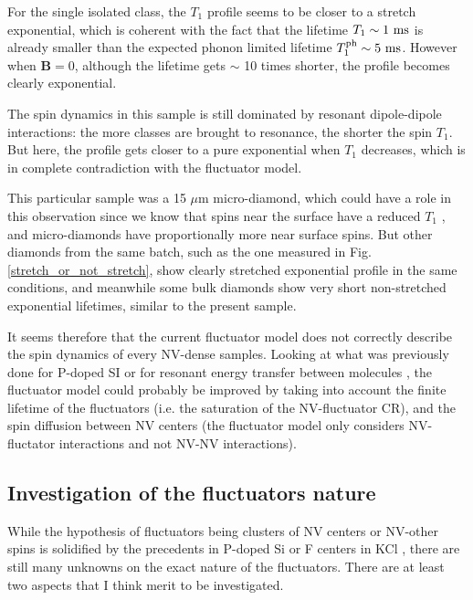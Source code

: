 \documentclass[a4paper,11pt]{report}
\begin{document}
For the single isolated class, the $T_1$ profile seems to be closer to a stretch exponential, which is coherent with the fact that the lifetime $T_1 \sim 1\ \rm ms$ is already smaller than the expected phonon limited lifetime $T_1^{\rm ph} \sim 5\ \rm ms$. However when $\mathbf{B}=0$, although the lifetime gets $\sim$ 10 times shorter, the profile becomes clearly exponential. 

The spin dynamics in this sample is still dominated by resonant dipole-dipole interactions: the more classes are brought to resonance, the shorter the spin $T_1$. But here, the profile gets closer to a pure exponential when $T_1$ decreases, which is in complete contradiction with the fluctuator model.

This particular sample was a 15 $\mu$m micro-diamond, which could have a role in this observation since we know that spins near the surface have a reduced $T_1$ \citep{rosskopf2014investigation}, and micro-diamonds have proportionally more near surface spins. But other diamonds from the same batch, such as the one measured in Fig. \ref{stretch_or_not_stretch}, show clearly stretched exponential profile in the same conditions, and meanwhile some bulk diamonds show very short non-stretched exponential lifetimes, similar to the present sample.

It seems therefore that the current fluctuator model does not correctly describe the spin dynamics of every NV-dense samples. Looking at what was previously done for P-doped SI \citep{vugmeister1978spin} or for resonant energy transfer between molecules \citep{yokota1967effects}, the fluctuator model could probably be improved by taking into account the finite lifetime of the fluctuators (i.e. the saturation of the NV-fluctuator CR), and the spin diffusion between NV centers (the fluctuator model only considers NV-fluctator interactions and not NV-NV interactions).

\subsection{Investigation of the fluctuators nature}
While the hypothesis of fluctuators being clusters of NV centers or NV-other spins is solidified by the precedents in P-doped Si \citep{honig1960electron} or F centers in KCl \citep{warren1964spin}, there are still many unknowns on the exact nature of the fluctuators. There are at least two aspects that I think merit to be investigated.
\end{document}
